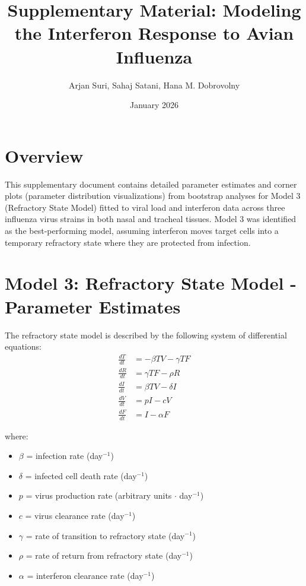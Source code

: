 \documentclass[12pt]{article}
\title{Supplementary Material: Modeling the Interferon Response to Avian Influenza}
\author{Arjan Suri, Sahaj Satani, Hana M. Dobrovolny}
\date{January 2026}
\begin{document}
\maketitle

\section*{Overview}
This supplementary document contains detailed parameter estimates and corner plots (parameter distribution visualizations) from bootstrap analyses for Model 3 (Refractory State Model) fitted to viral load and interferon data across three influenza virus strains in both nasal and tracheal tissues. Model 3 was identified as the best-performing model, assuming interferon moves target cells into a temporary refractory state where they are protected from infection.

\tableofcontents
\newpage

\section{Model 3: Refractory State Model - Parameter Estimates}

The refractory state model is described by the following system of differential equations:
\begin{align*}
\frac{dT}{dt} &= -\beta TV - \gamma TF\\
\frac{dR}{dt} &= \gamma TF - \rho R\\
\frac{dI}{dt} &= \beta TV - \delta I\\
\frac{dV}{dt} &= pI - cV\\
\frac{dF}{dt} &= I - \alpha F
\end{align*}

where:
\begin{itemize}
    \item $\beta$ = infection rate (day$^{-1}$)
    \item $\delta$ = infected cell death rate (day$^{-1}$)
    \item $p$ = virus production rate (arbitrary units $\cdot$ day$^{-1}$)
    \item $c$ = virus clearance rate (day$^{-1}$)
    \item $\gamma$ = rate of transition to refractory state (day$^{-1}$)
    \item $\rho$ = rate of return from refractory state (day$^{-1}$)
    \item $\alpha$ = interferon clearance rate (day$^{-1}$)
\end{itemize}
\end{document}
